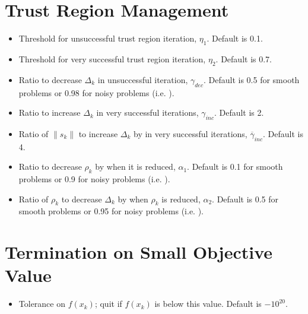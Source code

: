 \documentclass[letterpaper,10pt,english]{sphinxmanual}
\begin{document}
\section{Trust Region Management}
\label{\detokenize{advanced:trust-region-management}}\begin{itemize}
\item {} 
 \sphinxhyphen{} Threshold for unsuccessful trust region iteration, \(\eta_1\). Default is 0.1.

\item {} 
 \sphinxhyphen{} Threshold for very successful trust region iteration, \(\eta_2\). Default is 0.7.

\item {} 
 \sphinxhyphen{} Ratio to decrease \(\Delta_k\) in unsuccessful iteration, \(\gamma_{dec}\). Default is 0.5 for smooth problems or 0.98 for noisy problems (i.e. ).

\item {} 
 \sphinxhyphen{} Ratio to increase \(\Delta_k\) in very successful iterations, \(\gamma_{inc}\). Default is 2.

\item {} 
 \sphinxhyphen{} Ratio of \(\|s_k\|\) to increase \(\Delta_k\) by in very successful iterations, \(\overline{\gamma}_{inc}\). Default is 4.

\item {} 
 \sphinxhyphen{} Ratio to decrease \(\rho_k\) by when it is reduced, \(\alpha_1\). Default is 0.1 for smooth problems or 0.9 for noisy problems (i.e. ).

\item {} 
 \sphinxhyphen{} Ratio of \(\rho_k\) to decrease \(\Delta_k\) by when \(\rho_k\) is reduced, \(\alpha_2\). Default is 0.5 for smooth problems or 0.95 for noisy problems (i.e. ).

\end{itemize}


\section{Termination on Small Objective Value}
\label{\detokenize{advanced:termination-on-small-objective-value}}\begin{itemize}
\item {} 
 \sphinxhyphen{} Tolerance on \(f(x_k)\); quit if \(f(x_k)\) is below this value. Default is \(-10^{20}\).

\end{itemize}
\end{document}
